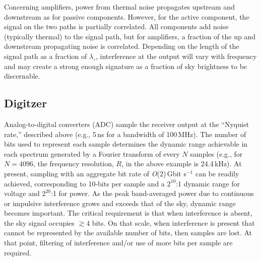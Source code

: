 Concerning amplifiers, power from thermal noise propagates upstream and downstream as for passive components.  However, for the active component, the signal on the two paths is partially correlated.  All components add noise (typically thermal) to the signal path, but for amplifiers, a fraction of the up and downstream propagating noise is correlated.  Depending on the length of the signal path as a fraction of $\lambda_\circ$, interference at the output will vary with frequency and may create a strong enough signature as a fraction of sky brightness to be discernable.


\subsection{Digitzer}
  
Analog-to-digital converters (ADC) sample the receiver output at the ``Nyquist rate,'' described above (e.g., 5\,ns for a bandwidth of 100\,MHz).  The number of bits used to represent each sample determines the dynamic range achievable in each spectrum generated by a Fourier transform of every $N$ samples (e.g., for $N=4096$, the frequency resolution, $R$, in the above example is 24.4\,kHz).  At present, sampling with an aggregate bit rate of {\it O}(2)\,Gbit s$^{-1}$ can be readily achieved, corresponding to 10-bits per sample and a $2^{10}$:1 dynamic range for voltage and $2^{20}$:1 for power.  As the peak band-averaged power due to continuous or impulsive interference grows and exceeds that of the sky, dynamic range becomes important.  The critical requirement is that when interference is absent, the sky signal occupies $\gtrsim 4$ bits.  On that scale, when interference is present that cannot be represented by the available number of bits, then samples are lost.  At that point, filtering of interference and/or use of more bits per sample are required.


   

  
